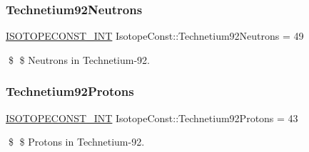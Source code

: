 \subsubsection{\texorpdfstring{Technetium92\+Neutrons}{Technetium92Neutrons}}
{\footnotesize\ttfamily \mbox{\hyperlink{group___isotope_const-_macros_ga5f18360b3e99483a35c32d789e62621c}{I\+S\+O\+T\+O\+P\+E\+C\+O\+N\+S\+T\+\_\+\+I\+NT}} Isotope\+Const\+::\+Technetium92\+Neutrons = 49}

\$ \$ Neutrons in Technetium-\/92. \mbox{\label{group___isotope_const-_technetium-_tc92_ga61c75d69a7d6558605424aa8ba3fcf55}} 
\subsubsection{\texorpdfstring{Technetium92\+Protons}{Technetium92Protons}}
{\footnotesize\ttfamily \mbox{\hyperlink{group___isotope_const-_macros_ga5f18360b3e99483a35c32d789e62621c}{I\+S\+O\+T\+O\+P\+E\+C\+O\+N\+S\+T\+\_\+\+I\+NT}} Isotope\+Const\+::\+Technetium92\+Protons = 43}

\$ \$ Protons in Technetium-\/92. 